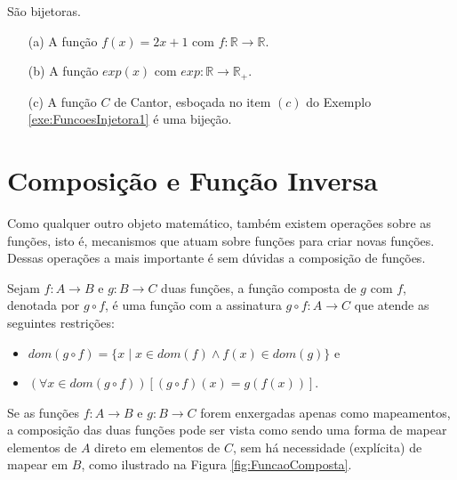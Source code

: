\begin{exemplo}
  São bijetoras.
  \begin{itemize}
    \item[(a)] A função $f(x) = 2x + 1$ com $f: \mathbb{R} \rightarrow \mathbb{R}$.
    \item[(b)] A função $exp(x)$ com $exp: \mathbb{R} \rightarrow \mathbb{R}_+$.
    \item[(c)] A função $C$ de Cantor, esboçada no item $(c)$ do Exemplo \ref{exe:FuncoesInjetora1} é uma bijeção.
  \end{itemize}
\end{exemplo}

\section{Composição e Função Inversa}\label{sec:FuncaoInversa}

Como qualquer outro objeto matemático, também existem operações sobre as funções, isto é, mecanismos que atuam sobre funções para criar novas funções. Dessas operações a mais importante é sem dúvidas a composição de funções.

\begin{definicao}\label{def:ComposicaoFuncional}
	Sejam $f: A \rightarrow B$ e $g: B \rightarrow C$ duas funções, a função composta de $g$ com $f$, denotada por $g \circ f$, é uma função com a assinatura $g \circ f: A \rightarrow C$ que atende as seguintes restrições:
	\begin{itemize}
		\item $dom(g \circ f) = \{x \mid x \in dom(f) \land f(x) \in dom(g)\}$ e 
		\item $(\forall x \in dom(g \circ f))[(g \circ f)(x) = g(f(x))]$.
	\end{itemize}
\end{definicao}

Se as funções $f: A \rightarrow B$ e $g: B \rightarrow C$ forem enxergadas apenas como mapeamentos, a composição  das duas funções pode ser vista como sendo uma forma de mapear elementos de $A$ direto em elementos de $C$, sem há necessidade (explícita) de mapear em $B$, como ilustrado na Figura \ref{fig:FuncaoComposta}.

